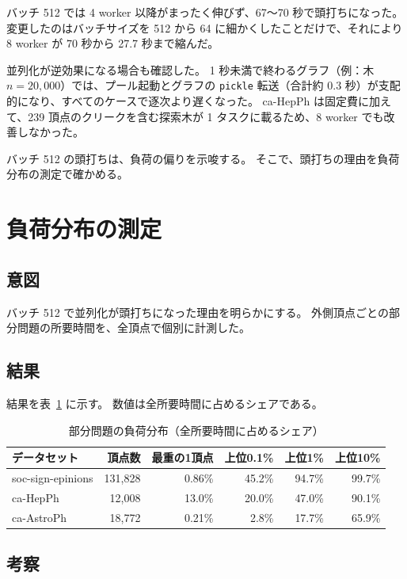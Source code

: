 バッチ 512 では 4 worker 以降がまったく伸びず、67〜70 秒で頭打ちになった。
変更したのはバッチサイズを 512 から 64 に細かくしたことだけで、それにより 8 worker が 70 秒から 27.7 秒まで縮んだ。

並列化が逆効果になる場合も確認した。
1 秒未満で終わるグラフ（例：木 $n{=}20{,}000$）では、プール起動とグラフの \texttt{pickle} 転送（合計約 0.3 秒）が支配的になり、すべてのケースで逐次より遅くなった。
ca-HepPh は固定費に加えて、239 頂点のクリークを含む探索木が 1 タスクに載るため、8 worker でも改善しなかった。

バッチ 512 の頭打ちは、負荷の偏りを示唆する。
そこで、頭打ちの理由を負荷分布の測定で確かめる。

\section{負荷分布の測定}
\label{sec:load-dist}

\subsection{意図}

バッチ 512 で並列化が頭打ちになった理由を明らかにする。
外側頂点ごとの部分問題の所要時間を、全頂点で個別に計測した。

\subsection{結果}

結果を表~\ref{tab:load-dist} に示す。
数値は全所要時間に占めるシェアである。

\begin{table}[htbp]
  \centering
  \caption{部分問題の負荷分布（全所要時間に占めるシェア）}
  \label{tab:load-dist}
  \begin{tabular}{lrrrrr}
    \toprule
    データセット & 頂点数 & 最重の1頂点 & 上位0.1\% & 上位1\% & 上位10\% \\
    \midrule
    soc-sign-epinions & 131{,}828 & 0.86\% & 45.2\% & 94.7\% & 99.7\% \\
    ca-HepPh          & 12{,}008  & 13.0\% & 20.0\% & 47.0\% & 90.1\% \\
    ca-AstroPh        & 18{,}772  & 0.21\% & 2.8\%  & 17.7\% & 65.9\% \\
    \bottomrule
  \end{tabular}
\end{table}

\subsection{考察}

